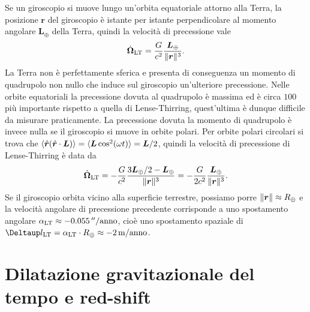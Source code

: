 Se un giroscopio si muove lungo un'orbita equatoriale attorno alla Terra, la
posizione $\bm{r}$ del giroscopio è istante per istante perpendicolare al
momento angolare $\bm{L}_{\oplus}$ della Terra, quindi la velocità di
precessione vale
\begin{equation}
  \dot{\bm{\Omega}}_{\textup{LT}} = \frac{G}{c^{2}}
  \frac{\bm{L}_{\oplus}}{\lVert\bm{r}\rVert^{3}}.
\end{equation}
La Terra non è perfettamente sferica e presenta di conseguenza un momento di
quadrupolo non nullo che induce sul giroscopio un'ulteriore precessione.  Nelle
orbite equatoriali la precessione dovuta al quadrupolo è massima ed è circa
$100$ più importante rispetto a quella di Lense-Thirring, quest'ultima è dunque
difficile da misurare praticamente.  La precessione dovuta la momento di
quadrupolo è invece nulla se il giroscopio si muove in orbite polari.  Per
orbite polari circolari si trova che
$\langle \hat{\bm{r}}(\hat{\bm{r}} \cdot \bm{L})\rangle = \langle \bm{L}
\cos^{2}(\omega t)\rangle = \bm{L}/2$,
quindi la velocità di precessione di Lense-Thirring è data da
\begin{equation}
  \dot{\bm{\Omega}}_{\textup{LT}} = -\frac{G}{c^{2}} \frac{3\bm{L}_{\oplus}/2 -
    \bm{L}_{\oplus}}{\lVert\bm{r}\rVert^{3}} = -\frac{G}{2c^{2}}
  \frac{\bm{L}_{\oplus}}{\lVert\bm{r}\rVert^{3}}.
\end{equation}
Se il giroscopio orbita vicino alla superficie terrestre, possiamo porre
$\lVert\bm{r}\rVert \approx R_{\oplus}$ e la velocità angolare di precessione
precedente corrisponde a uno spostamento angolare
$\alpha_{\textup{LT}} \approx -\SI{0.055}{\arcsecond/anno}$, cioè uno
spostamento spaziale di
$\var l_{\textup{LT}} = \alpha_{\textup{LT}} \cdot R_{\oplus} \approx
-\SI{2}{\metre/anno}$.

\section{Dilatazione gravitazionale del tempo e red-shift}
\label{sec:red-shift-gravitazionale}

